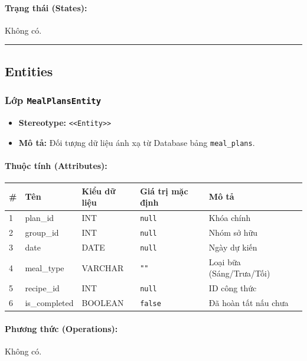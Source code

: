 \documentclass[12pt,a4paper]{article}
\begin{document}
\paragraph{Trạng thái (States):}
Không có.

\vskip 0.5cm
\noindent\rule{\textwidth}{0.5pt}
\vskip 0.5cm

\subsection{Entities}

\subsubsection{Lớp \texttt{MealPlansEntity}}
\begin{itemize}[leftmargin=*]
    \item \textbf{Stereotype:} \texttt{\textless{}\textless{}Entity\textgreater{}\textgreater{}}
    \item \textbf{Mô tả:} Đối tượng dữ liệu ánh xạ từ Database bảng \texttt{meal\_plans}.
\end{itemize}

\paragraph{Thuộc tính (Attributes):}
\begin{longtable}{|p{0.6cm}|p{2.8cm}|p{2.2cm}|p{1.8cm}|p{5.8cm}|}
\hline
\textbf{\#} & \textbf{Tên} & \textbf{Kiểu dữ liệu} & \textbf{Giá trị mặc định} & \textbf{Mô tả} \\ \hline
\endhead
1 & plan\_id & INT & \texttt{null} & Khóa chính \\ \hline
2 & group\_id & INT & \texttt{null} & Nhóm sở hữu \\ \hline
3 & date & DATE & \texttt{null} & Ngày dự kiến \\ \hline
4 & meal\_type & VARCHAR & \texttt{""} & Loại bữa (Sáng/Trưa/Tối) \\ \hline
5 & recipe\_id & INT & \texttt{null} & ID công thức \\ \hline
6 & is\_completed & BOOLEAN & \texttt{false} & Đã hoàn tất nấu chưa \\ \hline
\end{longtable}

\paragraph{Phương thức (Operations):}
Không có.
\end{document}
